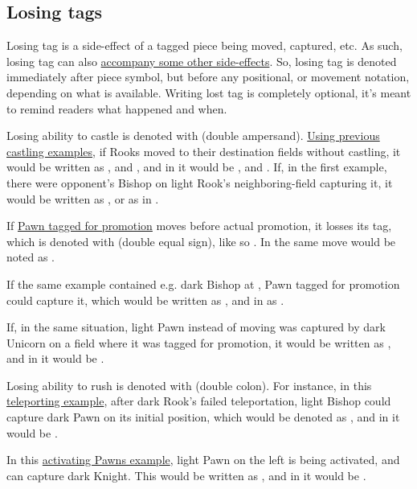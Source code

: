 \subsection*{Losing tags}
\label{sec:Appendix/Notation/Losing tags}

Losing tag is a side-effect of a tagged piece being moved, captured, etc. As such, losing tag can
also \hyperref[tbl:Appendix/Summary/Accompanying-losing-tags]{accompany some other side-effects}.
So, losing tag is denoted immediately after piece symbol, but before any positional, or movement
notation, depending on what is available. Writing lost tag is completely optional, it's meant to
remind readers what happened and when.

Losing ability to castle is denoted with \alg{\&\&} (double ampersand).
\hyperref[sec:Appendix/Notation/Castling]{Using previous castling examples}, if Rooks
moved to their destination fields without castling, it would be written as ,
and , and in  it would be , and .
If, in the first example, there were opponent's Bishop on light Rook's neighboring-field
capturing it, it would be written as , or as  in
.

If \hyperref[fig:scn_aoa_04_delayed_promo_pawn_2_tagged]{Pawn tagged for promotion} moves
before actual promotion, it losses its tag, which is denoted with \alg{==} (double equal
sign), like so . In  the same move would be noted as .

If the same example contained e.g. dark Bishop at , Pawn tagged for promotion could
capture it, which would be written as , and in  as .

If, in the same situation, light Pawn instead of moving was captured by dark Unicorn on a
field where it was tagged for promotion, it would be written as , and in
 it would be .

Losing ability to rush is denoted with \alg{::} (double colon). For instance, in this
\hyperref[fig:scn_n_03_teleport_move_2]{teleporting example}, after dark Rook's failed
teleportation, light Bishop could capture dark Pawn on its initial position, which would
be denoted as , and in  it would be .

In this \hyperref[fig:scn_mv_29_activating_rush_pawn_init]{activating Pawns example}, light
Pawn on the left is being activated, and can capture dark Knight. This would be written as
, and in  it would be
\alg{[Re6-e2]\~{}[We2-c2]\~{}[P::c2-b3*N]}.

